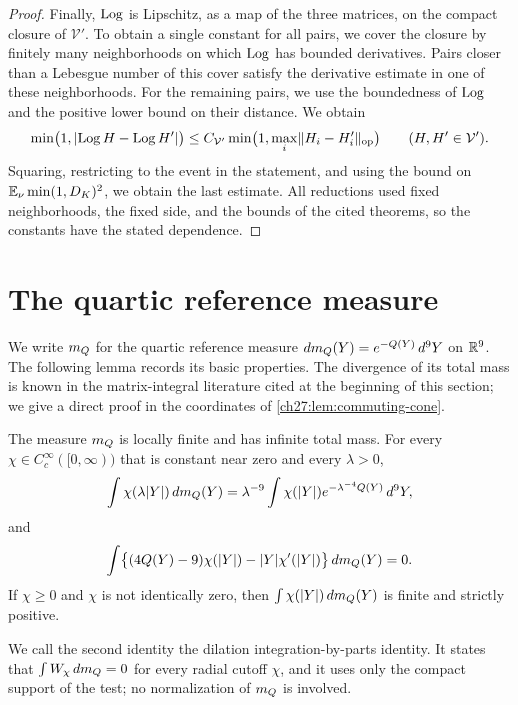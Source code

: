 \begin{proof}
Finally, $\operatorname{Log}$ is Lipschitz, as a map of the three matrices, on the compact closure of $\mathcal V'$. To obtain a single constant for all pairs, we cover the closure by finitely many neighborhoods on which $\operatorname{Log}$ has bounded derivatives. Pairs closer than a Lebesgue number of this cover satisfy the derivative estimate in one of these neighborhoods. For the remaining pairs, we use the boundedness of $\operatorname{Log}$ and the positive lower bound on their distance. We obtain
\[
 \min\bigl(1,\lvert \operatorname{Log} H-\operatorname{Log} H'\rvert\bigr)\le C_{\mathcal V'}\min\bigl(1,\max_i\lVert H_i-H_i'\rVert_{\mathrm{op}}\bigr)\qquad(H,H'\in\mathcal V').
\]
Squaring, restricting to the event in the statement, and using the bound on $\mathbb E_\nu\min(1,D_K)^2$, we obtain the last estimate. All reductions used fixed neighborhoods, the fixed side, and the bounds of the cited theorems, so the constants have the stated dependence.
\end{proof}

\section{The quartic reference measure}\label{ch32:sec:measure}

We write $m_Q$ for the quartic reference measure $dm_Q(Y)=e^{-Q(Y)}\,d^9Y$ on $\mathbb R^9$. The following lemma records its basic properties. The divergence of its total mass is known in the matrix-integral literature cited at the beginning of this section; we give a direct proof in the coordinates of \cref{ch27:lem:commuting-cone}.

\begin{lemma}\label{ch32:lem:quartic-intensity}
The measure $m_Q$ is locally finite and has infinite total mass. For every $\chi\in C_c^\infty([0,\infty))$ that is constant near zero and every $\lambda>0$,
\[
 \int\chi(\lambda\lvert Y\rvert)\,dm_Q(Y)=\lambda^{-9}\int\chi(\lvert Y\rvert)e^{-\lambda^{-4}Q(Y)}\,d^9Y,
\]
and
\[
 \int\bigl\{(4Q(Y)-9)\chi(\lvert Y\rvert)-\lvert Y\rvert\chi'(\lvert Y\rvert)\bigr\}\,dm_Q(Y)=0.
\]
If $\chi\ge0$ and $\chi$ is not identically zero, then $\int\chi(\lvert Y\rvert)\,dm_Q(Y)$ is finite and strictly positive.
\end{lemma}

We call the second identity the dilation integration-by-parts identity. It states that $\int W_\chi\,dm_Q=0$ for every radial cutoff $\chi$, and it uses only the compact support of the test; no normalization of $m_Q$ is involved.

